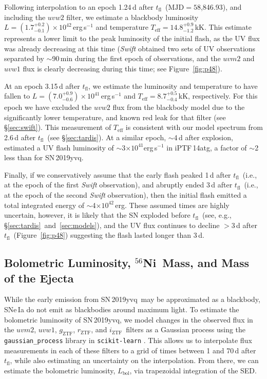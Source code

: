 \documentclass[twocolumn]{aastex63}
\newcommand{\rztf}{$r_\mathrm{ZTF}$}
\newcommand{\gztf}{$g_\mathrm{ZTF}$}
\newcommand{\iztf}{$i_\mathrm{ZTF}$}
\newcommand{\tfl}{$t_\mathrm{fl}$}
\newcommand{\radni}{$^{56}$Ni}
\newcommand{\sn}{SN\,2019yvq}
\begin{document}
Following interpolation to an epoch 1.24\,d after \tfl\ ($\mathrm{MJD} =
58$,846.93), and including the $uvw2$ filter, we estimate a blackbody
luminosity $L = (1.7^{+0.2}_{-0.1}) \times 10^{42}$\,erg\,s$^{-1}$ and
temperature $T_\mathrm{eff} = 14.8^{+0.9}_{-1.2}$\,kK. This estimate
represents a lower limit to the peak luminosity of the initial flash, as the
UV flux was already decreasing at this time (\textit{Swift} obtained two sets
of UV observations separated by $\sim$90\,min during the first epoch of
observations, and the $uvm2$ and $uvw1$ flux is clearly decreasing during this
time; see Figure~\ref{fig:p48}).

At an epoch 3.15\,d after \tfl, we estimate the luminosity and temperature to
have fallen to $L = (7.0^{+0.9}_{-0.6}) \times 10^{41}$\,erg\,s$^{-1}$ and
$T_\mathrm{eff} = 8.7^{+0.5}_{-0.4}$\,kK, respectively. For this epoch we have
excluded the $uvw2$ flux from the blackbody model due to the significantly
lower temperature, and known red leak for that filter (see \S\ref{sec:swift}).
This measurement of $T_\mathrm{eff}$ is consistent with our model spectrum
from 2.6\,d after \tfl\ (see \S\ref{sec:tardis}). At a similar epoch,
$\sim$4\,d after explosion, \citet{Cao15} estimated a UV flash luminosity of
$\sim$3$ \times 10^{41}$erg\,s$^{-1}$ in iPTF\,14atg, a factor of $\sim$2 less
than for \sn.

Finally, if we conservatively assume that the early flash peaked 1\,d after
\tfl\ (i.e., at the epoch of the first \textit{Swift} observation), and
abruptly ended 3\,d after \tfl\ (i.e., at the epoch of the second
\textit{Swift} observation), then the initial flash emitted a total integrated
energy of $\sim$4$\times 10^{42}$\,erg.
These assumed times are highly uncertain, however, it is likely that the SN
exploded before \tfl\ (see, e.g., \S\ref{sec:tardis}~and~\ref{sec:models}),
and the UV flux continues to decline $>$3\,d after \tfl\
(Figure~\ref{fig:p48}) suggesting the flash lasted longer than 3\,d.

\subsection{Bolometric Luminosity, \radni\ Mass, and Mass of the Ejecta}\label{sec:ni_mass}

While the early emission from \sn\ may be approximated as a blackbody, SNe\,Ia
do not emit as blackbodies around maximum light. To estimate the bolometric
luminosity of \sn, we model changes in the observed flux in the $uvm2$,
$uvw1$, \gztf, \rztf, and \iztf\ filters as a Gaussian process
\citep{Rasmussen06} using the \texttt{gaussian\_process} library in
\texttt{scikit-learn} \citep{Pedregosa11}. This allows us to interpolate flux
measurements in each of these filters to a grid of times between 1 and 70\,d
after \tfl, while also estimating an uncertainty on the interpolation. From
there, we can estimate the bolometric luminosity, $L_\mathrm{bol}$, via
trapezoidal integration of the SED.
\end{document}
